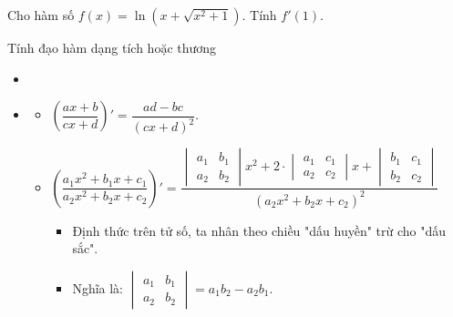 \begin{vd}
	Cho hàm số $f(x)=\ln \left(x+\sqrt{x^2+1}\right)$. Tính $f'(1)$.
\end{vd} 

\begin{dang}{Tính đạo hàm dạng tích hoặc thương}
	\begin{itemize}
		\item [\iconCH]   
		\item [\iconCH] 
		\begin{boxdl}
			\begin{itemize}
				\item [\ding{172}]  $\left(\dfrac{ax+ b}{cx + d}\right)' = \dfrac{ad - bc}{\left(cx + d\right)^2}$.
				\item [\ding{173}]  $\left(\dfrac{a_1 x^2 + b_1 x + c_1}{a_2 x^2 + b_2 x + c_2}\right)' = \dfrac{\begin{vmatrix}
						a_1&b_1\\
						a_2&b_2
					\end{vmatrix}x^2 + 2 \cdot \begin{vmatrix}
						a_1&c_1\\
						a_2&c_2
					\end{vmatrix}x + \begin{vmatrix}
						b_1&c_1\\
						b_2&c_2
				\end{vmatrix}}{\left(a_2 x^2 + b_2 x + c_2\right)^2}$
				\begin{itemize}
					\item [$\bullet$] Định thức trên tử số, ta nhân theo chiều "dấu huyền" trừ cho "dấu sắc".
					\item [$\bullet$] Nghĩa là: $\begin{vmatrix}
						a_1&b_1\\
						a_2&b_2
					\end{vmatrix}=a_1b_2-a_2b_1.$
				\end{itemize}
			\end{itemize}
		\end{boxdl}
	\end{itemize}
\end{dang}

